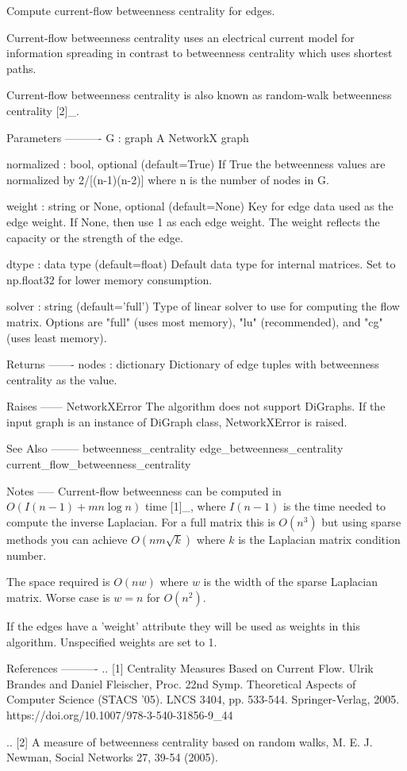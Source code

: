 \begin{DoxyVerb}Compute current-flow betweenness centrality for edges.

Current-flow betweenness centrality uses an electrical current
model for information spreading in contrast to betweenness
centrality which uses shortest paths.

Current-flow betweenness centrality is also known as
random-walk betweenness centrality [2]_.

Parameters
----------
G : graph
  A NetworkX graph

normalized : bool, optional (default=True)
  If True the betweenness values are normalized by 2/[(n-1)(n-2)] where
  n is the number of nodes in G.

weight : string or None, optional (default=None)
  Key for edge data used as the edge weight.
  If None, then use 1 as each edge weight.
  The weight reflects the capacity or the strength of the
  edge.

dtype : data type (default=float)
  Default data type for internal matrices.
  Set to np.float32 for lower memory consumption.

solver : string (default='full')
   Type of linear solver to use for computing the flow matrix.
   Options are "full" (uses most memory), "lu" (recommended), and
   "cg" (uses least memory).

Returns
-------
nodes : dictionary
   Dictionary of edge tuples with betweenness centrality as the value.

Raises
------
NetworkXError
    The algorithm does not support DiGraphs.
    If the input graph is an instance of DiGraph class, NetworkXError
    is raised.

See Also
--------
betweenness_centrality
edge_betweenness_centrality
current_flow_betweenness_centrality

Notes
-----
Current-flow betweenness can be computed in $O(I(n-1)+mn \log n)$
time [1]_, where $I(n-1)$ is the time needed to compute the
inverse Laplacian.  For a full matrix this is $O(n^3)$ but using
sparse methods you can achieve $O(nm{\sqrt k})$ where $k$ is the
Laplacian matrix condition number.

The space required is $O(nw)$ where $w$ is the width of the sparse
Laplacian matrix.  Worse case is $w=n$ for $O(n^2)$.

If the edges have a 'weight' attribute they will be used as
weights in this algorithm.  Unspecified weights are set to 1.

References
----------
.. [1] Centrality Measures Based on Current Flow.
   Ulrik Brandes and Daniel Fleischer,
   Proc. 22nd Symp. Theoretical Aspects of Computer Science (STACS '05).
   LNCS 3404, pp. 533-544. Springer-Verlag, 2005.
   https://doi.org/10.1007/978-3-540-31856-9_44

.. [2] A measure of betweenness centrality based on random walks,
   M. E. J. Newman, Social Networks 27, 39-54 (2005).
\end{DoxyVerb}
 